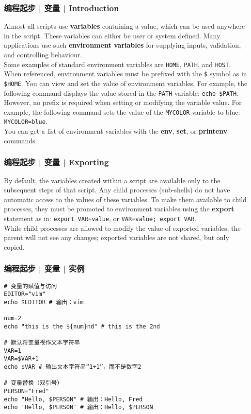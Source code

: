 \begin{frame}[fragile]
  \frametitle{编程起步 | 变量 | Introduction}
  Almost all scripts use \textbf{variables} containing a value, which can be used anywhere in the script. These variables can either be user or system defined. Many applications use such \textbf{environment variables} for supplying inputs, validation, and controlling behaviour.\\
  \vspace{0.2cm}
  Some examples of standard environment variables are \verb|HOME|, \verb|PATH|, and \verb|HOST|. When referenced, environment variables must be prefixed with the \verb|$| symbol as in \verb|$HOME|. You can view and set the value of environment variables. For example, the following command displays the value stored in the \verb|PATH| variable: \verb|echo $PATH|.\\
  \vspace{0.2cm}
  However, no prefix is required when setting or modifying the variable value. For example, the following command sets the value of the \verb|MYCOLOR| variable to blue: \verb|MYCOLOR=blue|.\\
  \vspace{0.2cm}
  You can get a list of environment variables with the \textbf{env}, \textbf{set}, or \textbf{printenv} commands.
\end{frame}

\begin{frame}[fragile]
  \frametitle{编程起步 | 变量 | Exporting}
  By default, the variables created within a script are available only to the subsequent steps of that script. Any child processes (sub-shells) do not have automatic access to the values of these variables. To make them available to child processes, they must be promoted to environment variables using the \textbf{export} statement as in: \verb|export VAR=value|, or \verb|VAR=value; export VAR|.\\
  \vspace{0.2cm}
  While child processes are allowed to modify the value of exported variables, the parent will not see any changes; exported variables are not shared, but only copied.
\end{frame}

\begin{frame}[fragile]
  \frametitle{编程起步 | 变量 | \alert{实例}}
\begin{lstlisting}
# 变量的赋值与访问
EDITOR="vim"
echo $EDITOR # 输出：vim

num=2
echo "this is the ${num}nd" # this is the 2nd

# 默认将变量视作文本字符串
VAR=1
VAR=$VAR+1
echo $VAR # 输出文本字符串“1+1”，而不是数字2

# 变量替换（双引号）
PERSON="Fred"
echo "Hello, $PERSON" # 输出：Hello, Fred
echo 'Hello, $PERSON' # 输出：Hello, $PERSON
\end{lstlisting}
\end{frame}

